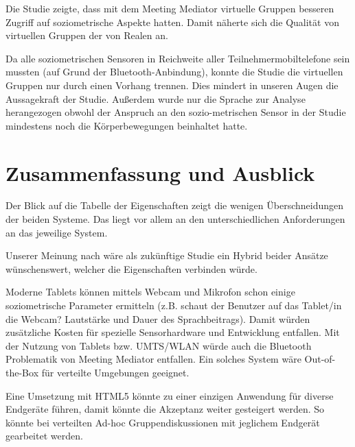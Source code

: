 \documentclass{seminarvorlage}
\begin{document}
Die Studie zeigte, dass mit dem Meeting Mediator virtuelle Gruppen besseren
Zugriff auf soziometrische Aspekte hatten. Damit näherte sich die Qualität von
virtuellen Gruppen der von Realen an.

Da alle soziometrischen Sensoren in Reichweite aller Teilnehmermobiltelefone
sein mussten (auf Grund der Bluetooth-Anbindung), konnte die Studie die
virtuellen Gruppen nur durch einen Vorhang trennen. Dies mindert in unseren
Augen die Aussagekraft der Studie.
Außerdem wurde nur die Sprache zur Analyse herangezogen obwohl der Anspruch an
den sozio-metrischen Sensor in der Studie mindestens noch die Körperbewegungen
beinhaltet hatte.

\section{Zusammenfassung und Ausblick}
Der Blick auf die Tabelle der Eigenschaften zeigt die wenigen Überschneidungen
der beiden Systeme. Das liegt vor allem an den unterschiedlichen Anforderungen
an das jeweilige System.

Unserer Meinung nach wäre als zukünftige Studie ein Hybrid beider Ansätze
wünschenswert, welcher die Eigenschaften verbinden würde. 

Moderne Tablets können mittels Webcam und Mikrofon schon einige soziometrische
Parameter ermitteln (z.B. schaut der Benutzer auf das Tablet/in die Webcam?
Lautstärke und Dauer des Sprachbeitrags). Damit würden zusätzliche Kosten für
spezielle Sensorhardware und Entwicklung entfallen. Mit der Nutzung von Tablets
bzw.
UMTS/WLAN würde auch die Bluetooth Problematik von Meeting Mediator entfallen.
Ein solches System wäre Out-of-the-Box für verteilte Umgebungen geeignet.

Eine Umsetzung mit HTML5 könnte zu einer einzigen Anwendung für diverse
Endgeräte führen, damit könn\-te die Akzeptanz weiter gesteigert werden. So
könn\-te bei verteilten Ad-hoc Gruppendiskussionen mit jeglichem Endgerät
gearbeitet werden.
\end{document}
